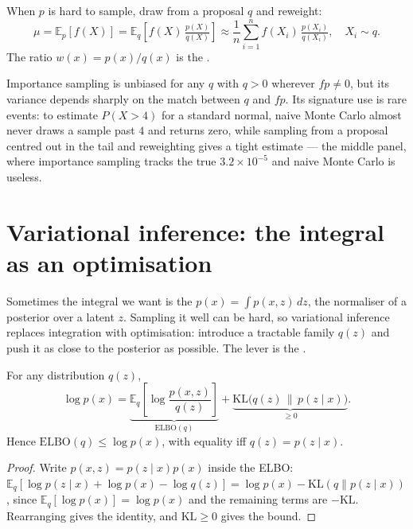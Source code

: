 \documentclass[11pt]{article}
\begin{document}
\begin{definition}
When $p$ is hard to sample, draw from a proposal $q$ and reweight:
\[
  \mu = \mathbb{E}_p[f(X)] = \mathbb{E}_q\!\left[f(X)\,\tfrac{p(X)}{q(X)}\right]
      \approx \frac1n\sum_{i=1}^n f(X_i)\,\tfrac{p(X_i)}{q(X_i)},\quad X_i\sim q.
\]
The ratio $w(x)=p(x)/q(x)$ is the .
\end{definition}

Importance sampling is unbiased for any $q$ with $q>0$ wherever $fp\ne 0$, but
its variance depends sharply on the match between $q$ and $f p$. Its signature
use is rare events: to estimate $P(X>4)$ for a standard normal, naive Monte
Carlo almost never draws a sample past $4$ and returns zero, while sampling from
a proposal centred out in the tail and reweighting gives a tight estimate --- the
middle panel, where importance sampling tracks the true $3.2\times10^{-5}$ and
naive Monte Carlo is useless.

\section{Variational inference: the integral as an optimisation}

Sometimes the integral we want is the 
$p(x) = \int p(x,z)\,dz$, the normaliser of a posterior over a latent $z$.
Sampling it well can be hard, so variational inference replaces integration with
optimisation: introduce a tractable family $q(z)$ and push it as close to the
posterior as possible. The lever is the .

\begin{theorem}
For any distribution $q(z)$,
\[
  \log p(x) = \underbrace{\mathbb{E}_{q}\!\left[\log\frac{p(x,z)}{q(z)}\right]}_{\mathrm{ELBO}(q)}
            + \underbrace{\mathrm{KL}\big(q(z)\,\|\,p(z\mid x)\big)}_{\ge 0}.
\]
Hence $\mathrm{ELBO}(q)\le \log p(x)$, with equality iff $q(z)=p(z\mid x)$.
\end{theorem}
\begin{proof}
Write $p(x,z)=p(z\mid x)p(x)$ inside the ELBO:
$\mathbb{E}_q[\log p(z\mid x)+\log p(x)-\log q(z)]
= \log p(x) - \mathrm{KL}(q\|p(z\mid x))$, since $\mathbb{E}_q[\log p(x)]=\log
p(x)$ and the remaining terms are $-\mathrm{KL}$. Rearranging gives the identity,
and $\mathrm{KL}\ge 0$ gives the bound.
\end{proof}
\end{document}
